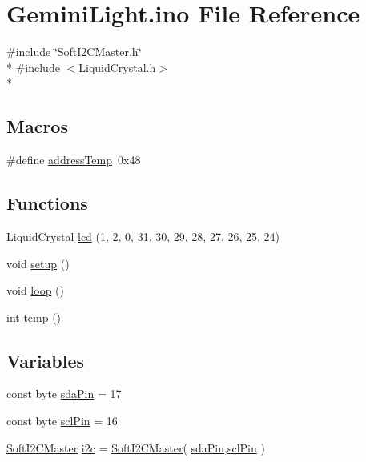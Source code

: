 \hypertarget{_gemini_light_8ino}{\section{Gemini\-Light.\-ino File Reference}
\label{_gemini_light_8ino}
}
{\ttfamily \#include \char`\"{}Soft\-I2\-C\-Master.\-h\char`\"{}}\\*
{\ttfamily \#include $<$Liquid\-Crystal.\-h$>$}\\*
\subsection*{Macros}
\begin{DoxyCompactItemize}
\item 
\#define \hyperlink{_gemini_light_8ino_a7c9dedced025ba516393918592e3d36b}{address\-Temp}~0x48
\end{DoxyCompactItemize}
\subsection*{Functions}
\begin{DoxyCompactItemize}
\item 
Liquid\-Crystal \hyperlink{_gemini_light_8ino_a59e74bd9e0aa6989df5d34630db59c8d}{lcd} (1, 2, 0, 31, 30, 29, 28, 27, 26, 25, 24)
\item 
void \hyperlink{_gemini_light_8ino_a4fc01d736fe50cf5b977f755b675f11d}{setup} ()
\item 
void \hyperlink{_gemini_light_8ino_afe461d27b9c48d5921c00d521181f12f}{loop} ()
\item 
int \hyperlink{_gemini_light_8ino_a9a90ccf6fa5cb74d44133a5ee0bff148}{temp} ()
\end{DoxyCompactItemize}
\subsection*{Variables}
\begin{DoxyCompactItemize}
\item 
const byte \hyperlink{_gemini_light_8ino_afa6793708eee64e6f0f328cbc61b5b22}{sda\-Pin} = 17
\item 
const byte \hyperlink{_gemini_light_8ino_a22f7ca6ca71734a01a826f4abd36e13e}{scl\-Pin} = 16
\item 
\hyperlink{class_soft_i2_c_master}{Soft\-I2\-C\-Master} \hyperlink{_gemini_light_8ino_a96d6210f68eedf93194e99ebe63ebdf2}{i2c} = \hyperlink{class_soft_i2_c_master}{Soft\-I2\-C\-Master}( \hyperlink{_gemini_light_8ino_afa6793708eee64e6f0f328cbc61b5b22}{sda\-Pin},\hyperlink{_gemini_light_8ino_a22f7ca6ca71734a01a826f4abd36e13e}{scl\-Pin} )
\end{DoxyCompactItemize}


